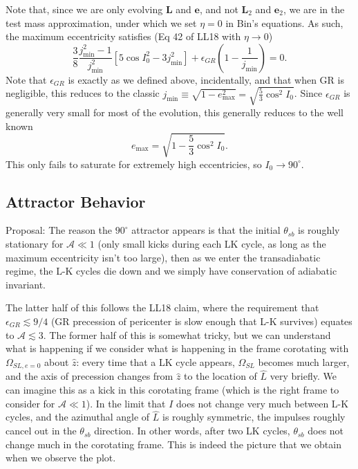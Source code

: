 \documentclass[11pt,
        usenames, %
        dvipsnames %
    ]{article}
\newcommand*{\bm}[1]{\boldsymbol{\mathbf{#1}}}
\newcommand*{\p}[1]{\left(#1\right)}
\newcommand*{\s}[1]{\left[#1\right]}
\begin{document}
Note that, since we are only evolving $\bm{L}$ and $\bm{e}$, and not $\bm{L}_2$
and $\bm{e}_2$, we are in the test mass approximation, under which we set $\eta
= 0$ in Bin's equations. As such, the maximum eccentricity satisfies (Eq 42 of
LL18 with $\eta \to 0$)
\begin{equation}
    \frac{3}{8}\frac{j_{\min}^2 - 1}{j_{\min}^2}\s{
        5\cos I_0^2 - 3j_{\min}^2} + \epsilon_{GR}\p{1 - \frac{1}{j_{\min}}} =
        0.
\end{equation}
Note that $\epsilon_{GR}$ is exactly as we defined above, incidentally, and that
when GR is negligible, this reduces to the classic $j_{\min} \equiv \sqrt{1 -
e_{\max}^2} = \sqrt{\frac{5}{3}\cos^2 I_0}$. Since $\epsilon_{GR}$ is generally
very small for most of the evolution, this generally reduces to the well known
\begin{equation}
    e_{\max} = \sqrt{1 - \frac{5}{3}\cos^2I_0}.
\end{equation}
This only fails to saturate for extremely high eccentricies, so $I_0 \to
90^\circ$.

\subsection{Attractor Behavior}

Proposal: The reason the $90^\circ$ attractor appears is that the initial
$\theta_{sb}$ is roughly stationary for $\mathcal{A} \ll 1$ (only small kicks
during each LK cycle, as long as the maximum eccentricity isn't too large), then
as we enter the transadiabatic regime, the L-K cycles die down and we simply
have conservation of adiabatic invariant.

The latter half of this follows the LL18 claim, where the requirement that
$\epsilon_{GR} \lesssim 9/4$ (GR precession of pericenter is slow enough that
L-K survives) equates to $\mathcal{A} \lesssim 3$. The former half of this is
somewhat tricky, but we can understand what is happening if we consider what is
happening in the frame corotating with $\Omega_{SL, e = 0}$ about $\hat{z}$:
every time that a LK cycle appears, $\Omega_{SL}$ becomes much larger, and the
axis of precession changes from $\hat{z}$ to the location of $\hat{L}$ very
briefly. We can imagine this as a kick in this corotating frame (which is the
right frame to consider for $\mathcal{A} \ll 1$). In the limit that $I$ does not
change very much between L-K cycles, and the azimuthal angle of $\hat{L}$ is
roughly symmetric, the impulses roughly cancel out in the $\theta_{sb}$
direction. In other words, after two LK cycles, $\theta_{sb}$ does not change
much in the corotating frame. This is indeed the picture that we obtain when we
observe the plot.
\end{document}
